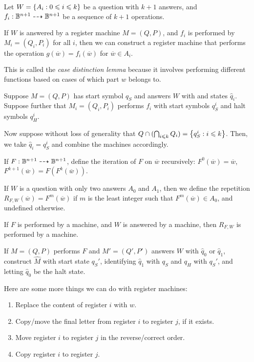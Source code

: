 \documentclass{article}
\begin{document}
\begin{proposition}
	\label{case-distinction-lemma}
	Let $W = \left\lbrace A_i: 0 \leqslant i \leqslant k \right\rbrace$ be a question with $k+1$ answers, and $f_i:  \mathbb{B}^{n+1} \dashrightarrow \mathbb{B}^{n+1}$ be a sequence of $k+1$ operations.
	    
	If $W$ is answered by a register machine $M = (Q, P)$, and $f_i$ is performed by $M_i = (Q_i, P_i)$ for all $i$, then we can construct a register machine that performs the operation $g(\overline w) = f_i(\overline w)$ for $\overline w \in A_i$.
	    
	This is called the \textit{case distinction lemma} because it involves performing different functions based on cases of which part $w$ belongs to.
\end{proposition}

\begin{prf}
	Suppose $M = (Q, P)$ has start symbol $q_S$ and answers $W$ with and states $\hat q_i$. Suppose further that $M_i = (Q_i, P_i)$ performs $f_i$ with start symbols $q_S^i$ and halt symbols $q_H^i$.
	    
	Now suppose without loss of generality that $Q \cap (\bigcap_{i \leqslant k} Q_i) = \left\lbrace q_S^i : i \leqslant k \right\rbrace$. Then, we take $\hat q_i = q_S^i$ and combine the machines accordingly.
\end{prf}

If $F: \mathbb{B}^{n+1} \dashrightarrow \mathbb{B}^{n+1}$, define the iteration of $F$ on $\overline w$ recursively: $F^0(\overline w) = \overline w$, $F^{k+1}(\overline w) = F(F^{k}(\overline w))$.

If $W$ is a question with only two answers $A_0$ and $A_1$, then we define the repetition $R_{F,W}(\overline w) = F^m(\overline w)$ if $m$ is the least integer such that $F^m(\overline w) \in A_0$, and undefined otherwise.

\begin{proposition}
	\label{repeat-lemma}
	If $F$ is performed by a machine, and $W$ is answered by a machine, then $R_{F, W}$ is performed by a machine.
\end{proposition}

\begin{prf}
	If $M = (Q, P)$ performs $F$ and $M' = (Q', P')$ answers $W$ with $\hat q_0$ or $\hat q_1$, construct $\hat M$ with start state $q_S'$, identifying $\hat q_1$ with $q_S$ and $q_H$ with $q_S'$, and letting $\hat q_0$ be the halt state.
\end{prf}

\begin{example}
	Here are some more things we can do with register machines:
	\begin{enumerate}
		\item Replace the content of register $i$ with $w$.
		\item Copy/move the final letter from register $i$ to register $j$, if it exists.
		\item Move register $i$ to register $j$ in the reverse/correct order.
		\item Copy register $i$ to register $j$.
	\end{enumerate}
\end{example}
\end{document}
